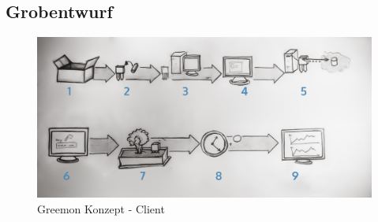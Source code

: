 \documentclass[pointlessnumbers]{scrartcl}
\begin{document}
\subsection{Grobentwurf}

\begin{figure}[htbp] 
  \centering
     \includegraphics[width=1\textwidth]{images/Skizze_Quickstartguide_numeriert.jpg}
  \caption{Greemon Konzept - Client}
  \label{fig:Bild1}
\end{figure}
\end{document}
